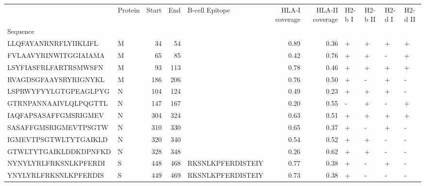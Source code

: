 \begin{tabular}{llrrlrrllll}
\toprule
{} & Protein &  Start &   End &     B-cell Epitope &  HLA-I coverage &  HLA-II coverage & H2-b I & H2-b II & H2-d I & H2-d II \\
Sequence              &         &        &       &                    &                 &                  &        &         &        &         \\
\midrule
LLQFAYANRNRFLYIIKLIFL &       M &     34 &    54 &                    &            0.89 &             0.36 &      + &       + &      + &       + \\
FVLAAVYRINWITGGIAIAMA &       M &     65 &    85 &                    &            0.42 &             0.76 &      + &       + &      - &       + \\
LSYFIASFRLFARTRSMWSFN &       M &     93 &   113 &                    &            0.78 &             0.46 &      + &       + &      + &       + \\
RVAGDSGFAAYSRYRIGNYKL &       M &    186 &   206 &                    &            0.76 &             0.50 &      + &       - &      + &       - \\
LSPRWYFYYLGTGPEAGLPYG &       N &    104 &   124 &                    &            0.49 &             0.23 &      + &       + &      + &       - \\
GTRNPANNAAIVLQLPQGTTL &       N &    147 &   167 &                    &            0.20 &             0.55 &      - &       + &      - &       + \\
IAQFAPSASAFFGMSRIGMEV &       N &    304 &   324 &                    &            0.63 &             0.51 &      + &       + &      + &       + \\
SASAFFGMSRIGMEVTPSGTW &       N &    310 &   330 &                    &            0.65 &             0.37 &      + &       - &      + &       - \\
IGMEVTPSGTWLTYTGAIKLD &       N &    320 &   340 &                    &            0.54 &             0.52 &      + &       + &      - &       - \\
GTWLTYTGAIKLDDKDPNFKD &       N &    328 &   348 &                    &            0.26 &             0.62 &      + &       + &      - &       - \\
NYNYLYRLFRKSNLKPFERDI &       S &    448 &   468 &  RKSNLKPFERDISTEIY &            0.77 &             0.38 &      + &       - &      + &       - \\
YNYLYRLFRKSNLKPFERDIS &       S &    449 &   469 &  RKSNLKPFERDISTEIY &            0.73 &             0.38 &      + &       - &      - &       - \\

\end{tabular}
